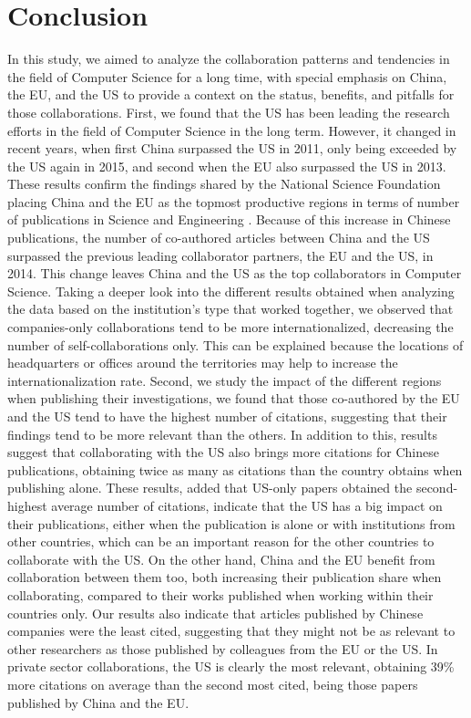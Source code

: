 \section{Conclusion}
\label{sec:conclusion}

In this study, we aimed to analyze the collaboration patterns and tendencies in the field of Computer Science for a long time, with special emphasis on China, the EU, and the US to provide a context on the status, benefits, and pitfalls for those collaborations.
First, we found that the US has been leading the research efforts in the field of Computer Science in the long term. However, it changed in recent years, when first China surpassed the US in 2011, only being exceeded by the US again in 2015, and second when the EU also surpassed the US in 2013. These results confirm the findings shared by the National Science Foundation placing China and the EU as the topmost productive regions in terms of number of publications in Science and Engineering \citep{burke2022state}. Because of this increase in Chinese publications, the number of co-authored articles between China and the US surpassed the previous leading collaborator partners, the EU and the US, in 2014. This change leaves China and the US as the top collaborators in Computer Science. Taking a deeper look into the different results obtained when analyzing the data based on the institution’s type that worked together, we observed that companies-only collaborations tend to be more internationalized, decreasing the number of self-collaborations only. This can be explained because the locations of headquarters or offices around the territories may help to increase the internationalization rate.
Second, we study the impact of the different regions when publishing their investigations, we found that those co-authored by the EU and the US tend to have the highest number of citations, suggesting that their findings tend to be more relevant than the others. In addition to this, results suggest that collaborating with the US also brings more citations for Chinese publications, obtaining twice as many as citations than the country obtains when publishing alone. These results, added that US-only papers obtained the second-highest average number of citations, indicate that the US has a big impact on their publications, either when the publication is alone or with institutions from other countries, which can be an important reason for the other countries to collaborate with the US. On the other hand, China and the EU benefit from collaboration between them too, both increasing their publication share when collaborating, compared to their works published when working within their countries only. Our results also indicate that articles published by Chinese companies were the least cited, suggesting that they might not be as relevant to other researchers as those published by colleagues from the EU or the US. In private sector collaborations, the US is clearly the most relevant, obtaining 39\% more citations on average than the second most cited, being those papers published by China and the EU.
